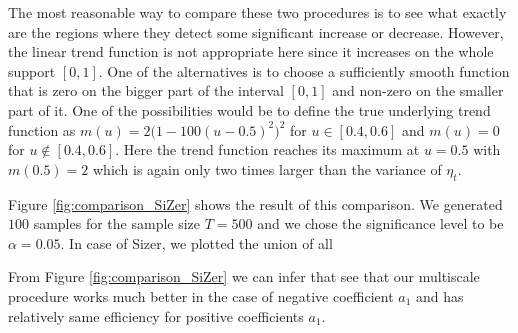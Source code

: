 \documentclass[a4paper,12pt]{article}
\begin{document}
The most reasonable way to compare these two procedures is to see what exactly are the regions where they detect some significant increase or decrease. However, the linear trend function is not appropriate here since it increases on the whole support $[0, 1]$. One of the alternatives is to choose a sufficiently smooth function that is zero on the bigger part of the interval $[0, 1]$ and non-zero on the smaller part of it. One of the possibilities would be to define the true underlying trend function as $m(u) = 2\big(1 - 100(u - 0.5)^2\big)^2$ for $u \in [0.4, 0.6]$ and $m(u) = 0$ for $u \notin [0.4, 0.6]$. Here the trend function reaches its maximum at $u = 0.5$ with $m(0.5) = 2$ which is again only two times larger than the variance of $\eta_t$.

Figure \ref{fig:comparison_SiZer} shows the result of this comparison. We generated $100$ samples for the sample size $T = 500$ and we chose the significance level to be $\alpha = 0.05$. In case of Sizer, we plotted the union of all      

From Figure \ref{fig:comparison_SiZer} we can infer that see that our multiscale procedure works much better in the case of negative coefficient $a_1$ and has relatively same efficiency for positive coefficients $a_1$.
\end{document}
